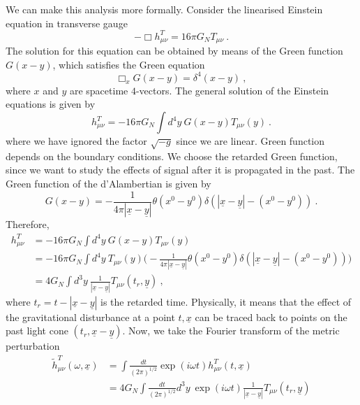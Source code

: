     We can make this analysis more formally. Consider the linearised Einstein equation in transverse gauge
    \begin{equation*}
        - \Box h_{\mu\nu}^T = 16 \pi G_N T_{\mu\nu} ~.
    \end{equation*}
    The solution for this equation can be obtained by means of the Green function $G (x - y)$, which satisfies the Green equation 
    \begin{equation*}
        \Box_x G (x - y) = \delta^4 (x - y) ~,
    \end{equation*}
    where $x$ and $y$ are spacetime $4$-vectors.
    The general solution of the Einstein equations is given by
    \begin{equation*}
        h_{\mu\nu}^T = - 16 \pi G_N \int d^4 y ~ G  (x - y) T_{\mu \nu} (y) ~.
    \end{equation*}
    where we have ignored the factor $\sqrt{-g}$ since we are linear. Green function depends on the boundary conditions. We choose the retarded Green function, since we want to study the effects of signal after it is propagated in the past. The Green function of the d'Alambertian is given by 
    \begin{equation*}
        G (x - y) = - \frac{1}{4\pi |\underline x - \underline y|} \theta (x^0 - y^0) \delta (|\underline x - \underline y| - (x^0 - y^0)) ~.
    \end{equation*}
    Therefore, 
    \begin{equation*}
    \begin{aligned}
        h_{\mu\nu}^T & = - 16 \pi G_N \int d^4 y ~ G (x - y) T_{\mu\nu} (y) \\ & = - 16 \pi G_N \int d^4 y ~T_{\mu\nu} (y) \Big (- \frac{1}{4\pi |\underline x - \underline y|} \theta (x^0 - y^0) \delta (|\underline x - \underline y| - (x^0 - y^0)) \Big ) \\ & = 4 G_N \int d^3 y ~ \frac{1}{|\underline x - \underline y|} T_{\mu\nu} (t_r, \underline y) ~,
    \end{aligned}
    \end{equation*}
    where $t_r = t - |\underline x - \underline y|$ is the retarded time. Physically, it means that the effect of the gravitational disturbance at a point $t, \underline x$ can be traced back to points on the past light cone $(t_r, \underline x - \underline y)$. Now, we take the Fourier transform of the metric perturbation 
    \begin{equation*}
    \begin{aligned}
        \tilde h^T_{\mu\nu} (\omega, \underline x) & = \int \frac{dt}{(2\pi)^{1/2}} \exp(i \omega t)  h^T_{\mu\nu} (t, \underline x) \\ & = 4 G_N \int \frac{dt}{(2\pi)^{1/2}} d^3 y ~ \exp(i \omega t) \frac{1}{|\underline x - \underline y|} T_{\mu\nu} (t_r, \underline y)
    \end{aligned}
    \end{equation*}
